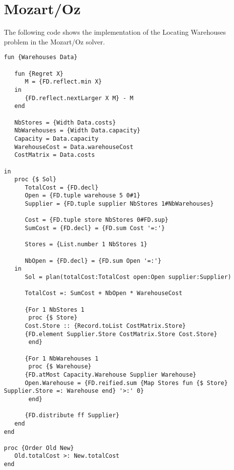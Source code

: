 \section{Mozart/Oz}

The following code shows the implementation of the Locating Warehouses problem in the
Mozart/Oz solver.

\begin{lstlisting}[language=Oz]
fun {Warehouses Data}
   
   fun {Regret X}
      M = {FD.reflect.min X}
   in
      {FD.reflect.nextLarger X M} - M
   end

   NbStores = {Width Data.costs}
   NbWarehouses = {Width Data.capacity}
   Capacity = Data.capacity
   WarehouseCost = Data.warehouseCost
   CostMatrix = Data.costs
   
in
   proc {$ Sol}
      TotalCost = {FD.decl}
      Open = {FD.tuple warehouse 5 0#1}
      Supplier = {FD.tuple supplier NbStores 1#NbWarehouses}

      Cost = {FD.tuple store NbStores 0#FD.sup}
      SumCost = {FD.decl} = {FD.sum Cost '=:'}

      Stores = {List.number 1 NbStores 1}

      NbOpen = {FD.decl} = {FD.sum Open '=:'}
   in
      Sol = plan(totalCost:TotalCost open:Open supplier:Supplier)

      TotalCost =: SumCost + NbOpen * WarehouseCost

      {For 1 NbStores 1
       proc {$ Store}
	  Cost.Store :: {Record.toList CostMatrix.Store}
	  {FD.element Supplier.Store CostMatrix.Store Cost.Store}
       end}

      {For 1 NbWarehouses 1
       proc {$ Warehouse}
	  {FD.atMost Capacity.Warehouse Supplier Warehouse}
	  Open.Warehouse = {FD.reified.sum {Map Stores fun {$ Store} Supplier.Store =: Warehouse end} '>:' 0}
       end}
      
      {FD.distribute ff Supplier}
   end
end

proc {Order Old New}
   Old.totalCost >: New.totalCost
end
\end{lstlisting}
